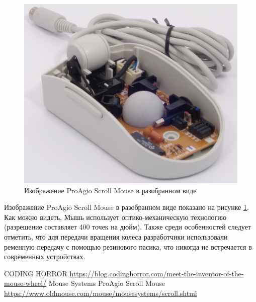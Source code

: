 \documentclass[11pt, a4paper]{article}
\begin{document}
\begin{figure}[h]
    \centering
    \includegraphics[scale=0.8]{1995_pro_agio_scroll_mouse/6.3.jpg}
    \caption{Изображение ProAgio Scroll Mouse в разобранном виде}
    \label{fig:ScrollInside}
\end{figure}

Изображение ProAgio Scroll Mouse в разобранном виде показано на рисунке \ref{fig:ScrollInside}. Как можно видеть, Мышь использует оптико-механическую технологию (разрешение составляет 400 точек на дюйм). Также среди особенностей следует отметить, что для передачи вращения колеса разработчики использовали ременную передачу с помощью резинового пасика, что никогда не встречается в современных устройствах.

\begin{thebibliography}{9}
 CODING HORROR \url{https://blog.codinghorror.com/meet-the-inventor-of-the-mouse-wheel/}
 Mouse Systems ProAgio Scroll Mouse \url{https://www.oldmouse.com/mouse/mousesystems/scroll.shtml}
\end{thebibliography}
\end{document}
